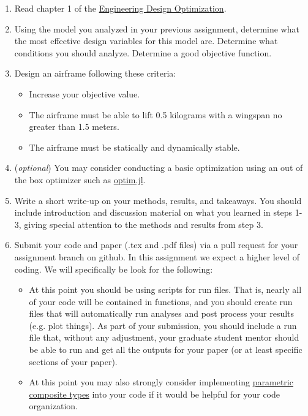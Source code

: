 \documentclass[12pt]{article}
\begin{document}
\begin{enumerate}
	\item Read chapter 1 of the \href{http://flowlab.groups.et.byu.net/mdobook.pdf}{Engineering Design Optimization}. 
	\item Using the model you analyzed in your previous assignment, determine what the most effective design variables for this model are. Determine what conditions you should analyze. Determine a good objective function.
	\item Design an airframe following these criteria: 
	\begin{itemize}
		\item Increase your objective value.
		\item The airframe must be able to lift 0.5 kilograms with a wingspan no greater than 1.5 meters. 
		\item The airframe must be statically and dynamically stable. 
	\end{itemize}
	\item[] (\textit{optional}) You may consider conducting a basic optimization using an out of the box optimizer such as \href{https://github.com/JuliaNLSolvers/Optim.jl}{optim.jl}. 
	\item Write a short write-up on your methods, results, and takeaways. You should include introduction and discussion material on what you learned in steps 1-3, giving special attention to the methods and results from step 3. 
	\item Submit your code and paper (.tex and .pdf files) via a pull request for your assignment branch on github. In this assignment we expect a higher level of coding. We will specifically be look for the following: 
	\begin{itemize}
		\item At this point you should be using scripts for run files.  That is, nearly all of your code will be contained in functions, and you should create run files that will automatically run analyses and post process your results (e.g. plot things).  As part of your submission, you should include a run file that, without any adjustment, your graduate student mentor should be able to run and get all the outputs for your paper (or at least specific sections of your paper).
		\item At this point you may also strongly consider implementing \href{https://docs.julialang.org/en/v1/manual/types/#Composite-Types}{parametric composite types} into your code if it would be helpful for your code organization. 
	\end{itemize}
\end{enumerate}
\end{document}
